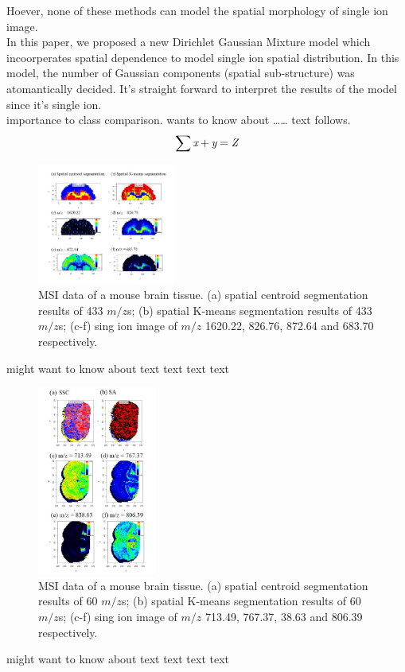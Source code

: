 \documentclass{bioinfo}
\begin{document}
Hoever, none of these methods can model the spatial morphology of single ion image.\\

In this paper, we proposed a new Dirichlet Gaussian Mixture model which incoorperates spatial dependence to model single ion spatial distribution. In this model, the number of Gaussian components (spatial sub-structure) was atomantically decided. It's straight forward to interpret the results of the model since it's single ion.\\

importance to class comparison.
  \citep{Bag01} wants to know about
{\ldots}{\ldots} text follows.
\begin{equation}
\sum \text{\it x}+ \text{\it y} =\text{\it Z}\label{eq:01}\vspace*{-10pt}
\end{equation}
\begin{figure}[b!]
    \centering
	\includegraphics[width=0.4\textwidth]{figure1.jpg}
    \caption{ MSI data of a mouse brain tissue. (a) spatial centroid segmentation results of 433 $m/z$s; (b) spatial K-means segmentation results of 433 $m/z$s; (c-f) sing ion image of $m/z$ 1620.22, 826.76, 872.64 and 683.70 respectively.}
    \label{fig:figure1}
\end{figure}
\citealp{Boffelli03} might want to know about text text text
text\vspace*{1pt}


\begin{figure}[b!]
    \centering
	\includegraphics[width=0.35\textwidth]{figure2.jpg}
    \caption{MSI data of a mouse brain tissue. (a) spatial centroid segmentation results of 60 $m/z$s; (b) spatial K-means segmentation results of 60 $m/z$s; (c-f) sing ion image of $m/z$ 713.49, 767.37, 38.63 and 806.39 respectively.}
    \label{fig:figure2}
\end{figure}
\citealp{Boffelli03} might want to know about text text text
text\vspace*{1pt}
\end{document}
